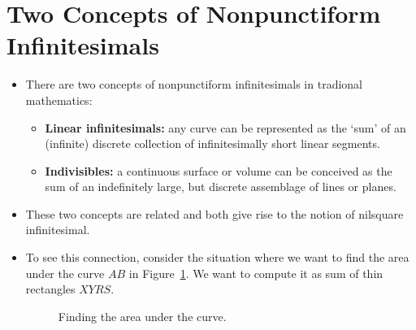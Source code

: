 \documentclass[10pt]{article}
\begin{document}
  \section{Two Concepts of Nonpunctiform Infinitesimals} %
  \label{sec:two_concepts_of_nonpunctiform_infinitesimals}

  \begin{itemize}
  	\item There are two concepts of nonpunctiform infinitesimals in tradional mathematics:
  	\begin{itemize}
  		\item {\bf Linear infinitesimals:} any curve can be represented as the `sum' of an (infinite) discrete collection of infinitesimally short linear segments.

  		\item {\bf Indivisibles:} a continuous surface or volume can be conceived as the sum of an indefinitely large, but discrete assemblage of lines or planes.
  	\end{itemize}

  	\item These two concepts are related and both give rise to the notion of nilsquare infinitesimal. 

  	\item To see this connection, consider the situation where we want to find the area under the curve $AB$ in Figure~\ref{intro-area-under-curve}. We want to compute it as sum of thin rectangles $XYRS$.

  	\begin{figure}[t]
  		\centering
  		\caption{Finding the area under the curve.}
  		\label{intro-area-under-curve}
  	\end{figure}


\end{itemize}
\end{document}
